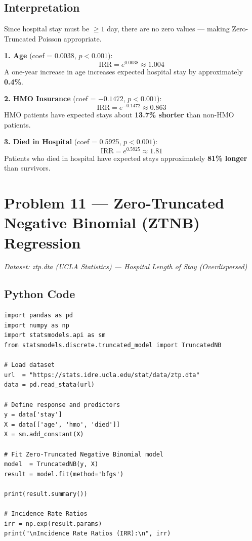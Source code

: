 \documentclass[12pt,a4paper]{article}
\begin{document}
\subsection{Interpretation}

\begin{interpbox}
Since hospital stay must be $\geq 1$ day, there are no zero values — making Zero-Truncated Poisson appropriate.

\textbf{1. Age} (coef = 0.0038, $p < 0.001$):
\[
  \text{IRR} = e^{0.0038} \approx 1.004
\]
A one-year increase in age increases expected hospital stay by approximately \textbf{0.4\%}.

\textbf{2. HMO Insurance} (coef = $-0.1472$, $p < 0.001$):
\[
  \text{IRR} = e^{-0.1472} \approx 0.863
\]
HMO patients have expected stays about \textbf{13.7\% shorter} than non-HMO patients.

\textbf{3. Died in Hospital} (coef = 0.5925, $p < 0.001$):
\[
  \text{IRR} = e^{0.5925} \approx 1.81
\]
Patients who died in hospital have expected stays approximately \textbf{81\% longer} than survivors.
\end{interpbox}

\newpage
\section{Problem 11 — Zero-Truncated Negative Binomial (ZTNB) Regression}

\textit{Dataset: ztp.dta (UCLA Statistics) — Hospital Length of Stay (Overdispersed)}

\subsection{Python Code}

\begin{lstlisting}
import pandas as pd
import numpy as np
import statsmodels.api as sm
from statsmodels.discrete.truncated_model import TruncatedNB

# Load dataset
url  = "https://stats.idre.ucla.edu/stat/data/ztp.dta"
data = pd.read_stata(url)

# Define response and predictors
y = data['stay']
X = data[['age', 'hmo', 'died']]
X = sm.add_constant(X)

# Fit Zero-Truncated Negative Binomial model
model  = TruncatedNB(y, X)
result = model.fit(method='bfgs')

print(result.summary())

# Incidence Rate Ratios
irr = np.exp(result.params)
print("\nIncidence Rate Ratios (IRR):\n", irr)
\end{lstlisting}
\end{document}
